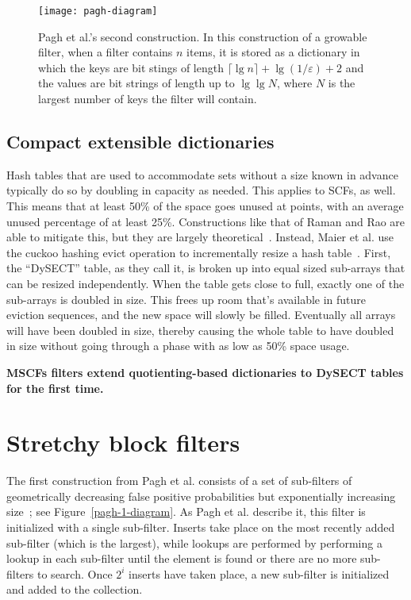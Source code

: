 \documentclass[letterpaper,twocolumn,10pt]{article}
\newcommand{\etal}{et al.}
\newcommand{\Taffy}{Stretchy}
\newcommand{\TCF}{SCF}
\newcommand{\MTCF}{MSCF}
\newcommand{\Taffy}{Taffy}
\newcommand{\TCF}{TCF}
\newcommand{\MTCF}{MTCF}
\begin{document}
\begin{figure}[b!]
\texttt{[image: pagh-diagram]}
\caption{\label{pagh-diagram}
Pagh \etal{}'s second construction.
In this construction of a growable filter, when a filter contains $n$ items, it is stored as a dictionary in which the keys are bit stings of length $\lceil \lg n \rceil + \lg (1/\varepsilon) + 2$ and the values are bit strings of length up to $\lg \lg N$, where $N$ is the largest number of keys the filter will contain.
}
\end{figure}



\subsection{Compact extensible dictionaries}

Hash tables that are used to accommodate sets without a size known in advance typically do so by doubling in capacity as needed.
This applies to \TCF{}s, as well.
This means that at least 50\% of the space goes unused at points, with an average unused percentage of at least 25\%.
Constructions like that of Raman and Rao are able to mitigate this, but they are largely theoretical~\cite{succinct}.
Instead, Maier \etal{} use the cuckoo hashing evict operation to incrementally resize a hash table~\cite{dysect}.
First, the ``DySECT'' table, as they call it, is broken up into equal sized sub-arrays that can be resized independently.
When the table gets close to full, exactly one of the sub-arrays is doubled in size.
This frees up room that's available in future eviction sequences, and the new space will slowly be filled.
Eventually all arrays will have been doubled in size, thereby causing the whole table to have doubled in size without going through a phase with as low as 50\% space usage.

{\bf \MTCF{}s filters extend quotienting-based dictionaries to DySECT tables for the first time.}

\section{\Taffy{} block filters}
\label{tbf}

The first construction from Pagh \etal{} consists of a set of sub-filters of geometrically decreasing false positive probabilities but exponentially increasing size~\cite{psw}; see Figure~\ref{pagh-1-diagram}.
As Pagh \etal{} describe it, this filter is initialized with a single sub-filter.
Inserts take place on the most recently added sub-filter (which is the largest), while lookups are performed by performing a lookup in each sub-filter until the element is found or there are no more sub-filters to search.
Once $2^i$ inserts have taken place, a new sub-filter is initialized and added to the collection.
\end{document}
